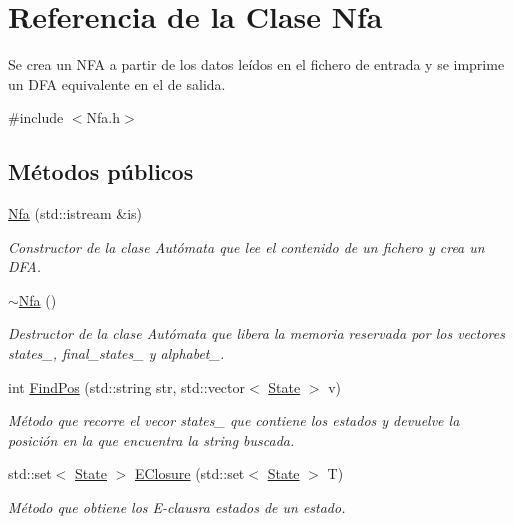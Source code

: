 \hypertarget{classNfa}{}\section{Referencia de la Clase Nfa}
\label{classNfa}


Se crea un N\+FA a partir de los datos leídos en el fichero de entrada y se imprime un D\+FA equivalente en el de salida.  




{\ttfamily \#include $<$Nfa.\+h$>$}

\subsection*{Métodos públicos}
\begin{DoxyCompactItemize}
\item 
\hyperlink{classNfa_aca6d706a62e9739d7eda1a33c2a8a7c4}{Nfa} (std\+::istream \&is)
\begin{DoxyCompactList}\small\item\em Constructor de la clase Autómata que lee el contenido de un fichero y crea un D\+FA. \end{DoxyCompactList}\item 
\mbox{\label{classNfa_a63f59d34c54fbd4be2448f9ff23e2cc8}} 
\hyperlink{classNfa_a63f59d34c54fbd4be2448f9ff23e2cc8}{$\sim$\+Nfa} ()
\begin{DoxyCompactList}\small\item\em Destructor de la clase Autómata que libera la memoria reservada por los vectores states\+\_\+, final\+\_\+states\+\_\+ y alphabet\+\_\+. \end{DoxyCompactList}\item 
int \hyperlink{classNfa_a23d169f1835db6b72220a941f65641a9}{Find\+Pos} (std\+::string str, std\+::vector$<$ \hyperlink{classState}{State} $>$ v)
\begin{DoxyCompactList}\small\item\em Método que recorre el vecor states\+\_\+ que contiene los estados y devuelve la posición en la que encuentra la string buscada. \end{DoxyCompactList}\item 
std\+::set$<$ \hyperlink{classState}{State} $>$ \hyperlink{classNfa_aa013967938ea5093bf27a20edc906752}{E\+Closure} (std\+::set$<$ \hyperlink{classState}{State} $>$ T)
\begin{DoxyCompactList}\small\item\em Método que obtiene los E-\/clausra estados de un estado. \end{DoxyCompactList}\item 

\end{DoxyCompactItemize}
